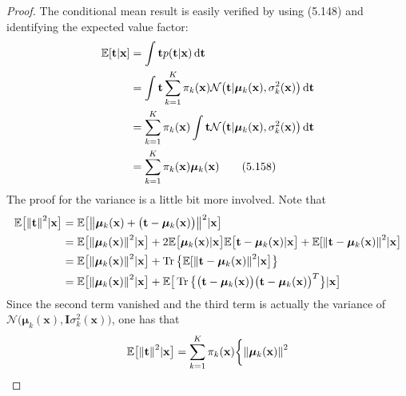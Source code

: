 \begin{proof}
    The conditional mean result is easily verified by using (5.148) and 
    identifying the expected value factor:
    \begin{align*}
        \mathbb{E}[\mathbf{t} | \mathbf{x}]
        &= \int \mathbf{t} p(\mathbf{t} | \mathbf{x}) \mathop{}\!\mathrm{d} \mathbf{t} \\
        &= \int \mathbf{t} \sum_{k=1}^{K} \pi_k(\mathbf{x}) 
            \mathcal{N}\big(\mathbf{t} | \bm{\mu}_k(\mathbf{x}), \sigma_k^2(\mathbf{x})\big) 
            \mathop{}\!\mathrm{d} \mathbf{t} \\
        &= \sum_{k=1}^{K} \pi_k(\mathbf{x}) \int \mathbf{t}
            \mathcal{N}\big(\mathbf{t} | \bm{\mu}_k(\mathbf{x}), \sigma_k^2(\mathbf{x})\big) 
            \mathop{}\!\mathrm{d} \mathbf{t} \\
        &= \sum_{k=1}^{K} \pi_k(\mathbf{x}) \bm{\mu}_k(\mathbf{x})
        \label{eq:5.158}\tag{5.158}
    \end{align*}
    The proof for the variance is a little bit more involved. Note that
    \begin{align*}
        \mathbb{E}\big[\norm{\mathbf{t}}^2 | \mathbf{x}\big]
        &= \mathbb{E}\big[\norm{\bm{\mu}_k(\mathbf{x}) + 
            \big(\mathbf{t} - \bm{\mu}_k(\mathbf{x})\big)}^2 | \mathbf{x}\big] \\
        &= \mathbb{E}\big[\norm{\bm{\mu}_k(\mathbf{x})}^2 | \mathbf{x}\big]
            + 2\mathbb{E}\big[\bm{\mu}_k(\mathbf{x}) | \mathbf{x}\big]\mathbb{E}\big[\mathbf{t} 
            - \bm{\mu}_k(\mathbf{x}) | \mathbf{x}\big] 
            + \mathbb{E}[\norm{\mathbf{t} - \bm{\mu}_k(\mathbf{x})}^2 | \mathbf{x}\big] \\
        &= \mathbb{E}\big[\norm{\bm{\mu}_k(\mathbf{x})}^2 | \mathbf{x}\big]
            + \Tr\big\{\mathbb{E}[\norm{\mathbf{t} 
                - \bm{\mu}_k(\mathbf{x})}^2 | \mathbf{x}\big]\big\} \\
        &= \mathbb{E}\big[\norm{\bm{\mu}_k(\mathbf{x})}^2 | \mathbf{x}\big] 
            + \mathbb{E}\big[\Tr\big\{\big(\mathbf{t} 
            - \bm{\mu}_k(\mathbf{x})\big)\big(\mathbf{t} - \bm{\mu}_k(\mathbf{x})\big)^T\big\}
            | \mathbf{x}\big]
    \end{align*}
    Since the second term vanished and the third term is actually the variance
    of $\mathcal{N}\big(\bm{\mu}_k(\mathbf{x}), \mathbf{I}\sigma_k^2(\mathbf{x})\big)$,
    one has that
    \[
        \mathbb{E}\big[\norm{\mathbf{t}}^2 | \mathbf{x}\big]
        = \sum_{k=1}^{K} \pi_k(\mathbf{x}) \bigg\{\norm{\bm{\mu}_k(\mathbf{x})}^2 
\]
\end{proof}
